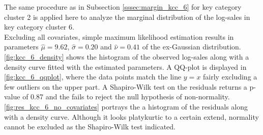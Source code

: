 
The same procedure as in Subsection \ref{sssec:margin_kcc_6} for key category cluster 2 is applied here to analyze the marginal distribution of the log-sales in key category cluster 6.\\

Excluding all covariates, simple maximum likelihood estimation results in parameters $\hat{\mu} = 9.62$, $\hat{\sigma} = 0.20$ and $\hat{\nu} = 0.41$ of the ex-Gaussian distribution.
\autoref{fig:kcc_6_density} shows the histogram of the observed log-sales along with a density curve fitted with the estimated parameters. A QQ-plot is displayed in \autoref{fig:kcc_6_qqplot}, where the data points match the line $y=x$ fairly excluding a few outliers on the upper part.
 A Shapiro-Wilk test on the residuals returns a p-value of 0.87 and the fails to reject the null hypothesis of non-normality. \autoref{fig:res_kcc_6_no_covariates} portrays the a histogram of the residuals along with a density curve. Although it looks platykurtic to a certain extend, normality cannot be excluded as the Shapiro-Wilk test indicated.
\\


%



